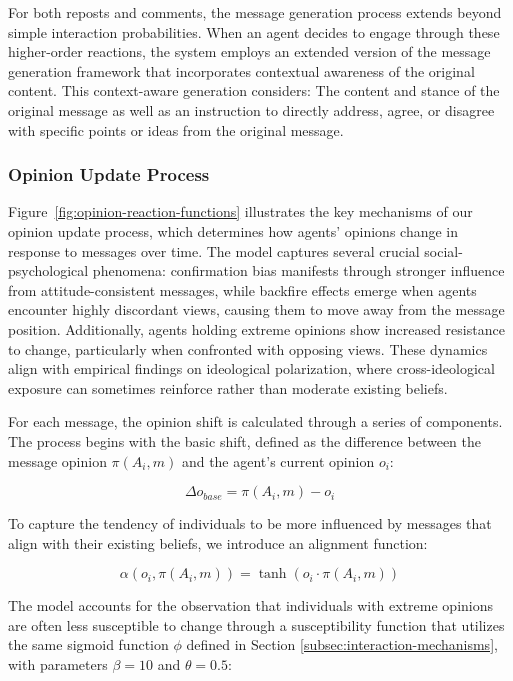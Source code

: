 For both reposts and comments, the message generation process extends beyond simple interaction probabilities. When an agent decides to engage through these higher-order reactions, the system employs an extended version of the message generation framework that incorporates contextual awareness of the original content. This context-aware generation considers: The content and stance of the original message as well as an instruction to directly address, agree, or disagree with specific points or ideas from the original message.

\subsubsection{Opinion Update Process}
\label{subsec:opinion-update-process} 

Figure~\ref{fig:opinion-reaction-functions} illustrates the key mechanisms of our opinion update process, which determines how agents' opinions change in response to messages over time. The model captures several crucial social-psychological phenomena: confirmation bias manifests through stronger influence from attitude-consistent messages, while backfire effects emerge when agents encounter highly discordant views, causing them to move away from the message position. Additionally, agents holding extreme opinions show increased resistance to change, particularly when confronted with opposing views. These dynamics align with empirical findings on ideological polarization, where cross-ideological exposure can sometimes reinforce rather than moderate existing beliefs.

For each message, the opinion shift is calculated through a series of components. The process begins with the basic shift, defined as the difference between the message opinion $\pi(A_i, m)$ and the agent's current opinion $o_i$:

\begin{equation}
    \Delta o_{base} = \pi(A_i, m) - o_i
\end{equation}

To capture the tendency of individuals to be more influenced by messages that align with their existing beliefs, we introduce an alignment function:

\begin{equation}
    \alpha(o_i, \pi(A_i, m)) = \tanh(o_i \cdot \pi(A_i, m))
\end{equation}

The model accounts for the observation that individuals with extreme opinions are often less susceptible to change through a susceptibility function that utilizes the same sigmoid function $\phi$ defined in Section \ref{subsec:interaction-mechanisms}, with parameters $\beta = 10$ and $\theta = 0.5$:

